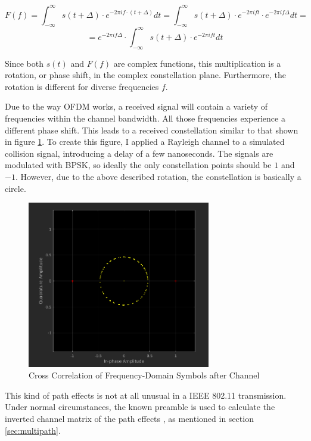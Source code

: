 $$ F(f) = \int_{-\infty}^{\infty} s(t + \Delta) \cdot e^{-2 \pi i f \cdot (t + \Delta)} dt = \int_{-\infty}^{\infty} s(t + \Delta) \cdot e^{-2 \pi i f t} \cdot e^{-2 \pi i f \Delta} dt = $$
$$ = e^{-2 \pi i f \Delta} \cdot \int_{-\infty}^{\infty} s(t + \Delta) \cdot e^{-2 \pi i f t} dt $$\vspace{0cm}

Since both $ s(t) $ and $ F(f) $ are complex functions, this multiplication is a rotation, or phase shift, in the complex constellation plane. Furthermore, the rotation is different for diverse frequencies $ f $.

Due to the way \gls{OFDM} works, a received signal will contain a variety of frequencies within the channel bandwidth. All those frequencies experience a different phase shift. This leads to a received constellation similar to that shown in figure \ref{fig:freqd-corr}. To create this figure, I applied a Rayleigh channel \cite{sklar1997} to a simulated collision signal, introducing a delay of a few nanoseconds. The signals are modulated with \gls{BPSK}, so ideally the only constellation points should be $ 1 $ and $ -1 $. However, due to the above described rotation, the constellation is basically a circle.

\begin{figure}[ht]
	\centering
	\includegraphics[width=8cm]{gfx/images/freqd-correlation}
	\caption{Cross Correlation of Frequency-Domain Symbols after Channel}
	\label{fig:freqd-corr}
\end{figure}

This kind of path effects is not at all unusual in a IEEE 802.11 transmission. Under normal circumstances, the known preamble is used to calculate the inverted channel matrix of the path effects \cite{perahia2013}, as mentioned in section \ref{sec:multipath}.\\


